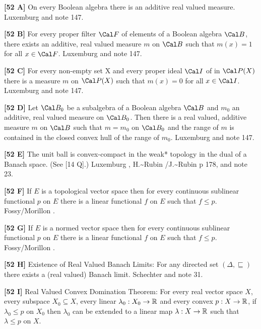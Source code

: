 \smallskip
\item{}{\bf [52 A]}  On every Boolean algebra there is an additive real
valued measure.  \ac{Luxemburg} \cite{1969} and note 147.
\smallskip
\item{}{\bf [52 B]} For every proper filter $\Cal F$ of elements of a
Boolean algebra $\Cal B$, there exists an additive, real valued measure
$m$ on $\Cal B$ such that $m(x) = 1$ for all $x\in\Cal F$.
\ac{Luxemburg} \cite{1969} and note 147.
\smallskip
\item{}{\bf [52 C]} For every non-empty set X and every proper ideal
$\Cal I$ of in $\Cal P(X)$ there is a measure $m$ on $\Cal P(X)$ such
that $m(x) = 0$ for all $x\in\Cal I$.  \ac{Luxemburg} \cite{1969} and
note 147.
\smallskip
\item{}{\bf [52 D]} Let $\Cal B_0$ be a subalgebra of a Boolean algebra
$\Cal B$ and $m_0$ an additive, real valued measure on $\Cal B_0$.
Then there is a real valued, additive measure $m$ on $\Cal B$ such that
$m = m_0$ on $\Cal B_0$ and the range of $m$ is contained in the closed
convex hull of the range of $m_0$.  \ac{Luxemburg} \cite{1969} and note 147.
\smallskip
\item{}{\bf [52 E]}   The unit  ball  is  convex-compact in  the
weak* topology in the dual of a Banach space. (See [14 Q].)
\ac{Luxemburg} \cite{1969}, \ac{H.~Rubin /J.~Rubin} \cite{1985} p 178,
and note 23.
\smallskip
\item{}{\bf [52 F]} If $E$ is a topological vector space then for every
continuous sublinear functional $p$ on $E$ there is a linear
functional $f$ on $E$ such that $f\le p$. \ac{Fossy/Morillon} \cite{1998}.
\smallskip
\item{}{\bf [52 G]}  If $E$ is a normed vector space then for every
continuous sublinear functional $p$ on $E$ there is a linear
functional $f$ on $E$ such that $f\le p$. \ac{Fossy/Morillon} \cite{1998}.
\smallskip
\item{}{\bf [52 H]} Existence of Real Valued Banach Limits: For any directed
set $(\Delta,\sqsubseteq)$ there exists a (real valued) Banach limit.
\ac{Schechter} \cite{1996b} and note 31.
\smallskip
\item{}{\bf [52 I]} Real Valued Convex Domination Theorem: For every real
vector space $X$, every subspace $X_0\subseteq X$, every linear
$\lambda_0 :X_0\to {\Bbb R}$ and every convex $p: X\to {\Bbb R}$, if
$\lambda_0 \le p$ on $X_0$ then $\lambda_0$ can be extended to a linear
map $\lambda: X\to {\Bbb R} $ such that $\lambda \le p$ on $X$.
